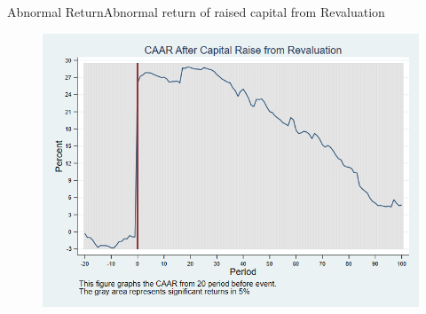 \documentclass{beamer}
\begin{document}
%





\begin{frame}{Abnormal Return}{Abnormal return of raised capital from Revaluation}
\label{abreturnrevalution}
\begin{figure}
\centering
\includegraphics[width=0.65\linewidth]{Output/CARRevaluation.png}
\label{fig:abreturnrevalution}
\end{figure}

\hfill\hyperlink{abreturnrevalution4Factor}{}
\end{frame}
\end{document}
